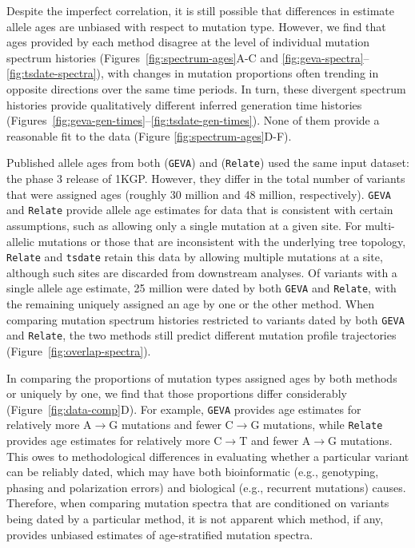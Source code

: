 \documentclass[]{article}
\newcommand{\GEVA}{\texttt{GEVA}\xspace}
\newcommand{\tsdate}{\texttt{tsdate}\xspace}
\newcommand{\relate}{\texttt{Relate}\xspace}
\begin{document}
Despite the imperfect correlation, it is still possible that differences in
estimate allele ages are unbiased with respect to mutation type. However, we
find that ages provided by each method disagree at the level of individual
mutation spectrum histories (Figures~\ref{fig:spectrum-ages}A-C and
\ref{fig:geva-spectra}--\ref{fig:tsdate-spectra}), with changes in mutation
proportions often trending in opposite directions over the same time periods.
In turn, these divergent spectrum histories provide qualitatively different
inferred generation time histories
(Figures~\ref{fig:geva-gen-times}--\ref{fig:tsdate-gen-times}). None of them
provide a reasonable fit to the data (Figure \ref{fig:spectrum-ages}D-F).

Published allele ages from both \citet{albers2020dating} (\GEVA) and
\citet{speidel2019method} (\relate) used the same input dataset: the phase 3
release of 1KGP. However, they differ in the total number of variants that were
assigned ages (roughly 30 million and 48 million, respectively). \GEVA and
\relate provide allele age estimates for data that is consistent with certain
assumptions, such as allowing only a single mutation at a given site. For
multi-allelic mutations or those that are inconsistent with the underlying tree
topology, \relate and \tsdate retain this data by allowing multiple mutations
at a site, although such sites are discarded from downstream analyses. Of
variants with a single allele age estimate, 25 million were dated by both \GEVA
and \relate, with the remaining uniquely assigned an age by one or the other
method. When comparing mutation spectrum histories restricted to variants dated
by both \GEVA and \relate, the two methods still predict different mutation
profile trajectories (Figure~\ref{fig:overlap-spectra}).

In comparing the proportions of mutation types assigned ages by both methods or
uniquely by one, we find that those proportions differ considerably
(Figure~\ref{fig:data-comp}D). For example, \GEVA provides age estimates for
relatively more A$\rightarrow$G mutations and fewer C$\rightarrow$G mutations,
while \relate provides age estimates for relatively more C$\rightarrow$T and
fewer A$\rightarrow$G mutations. This owes to methodological differences in
evaluating whether a particular variant can be reliably dated, which may have
both bioinformatic (e.g., genotyping, phasing and polarization errors) and
biological (e.g., recurrent mutations) causes. Therefore, when comparing
mutation spectra that are conditioned on variants being dated by a particular
method, it is not apparent which method, if any, provides unbiased estimates of
age-stratified mutation spectra.
\end{document}
